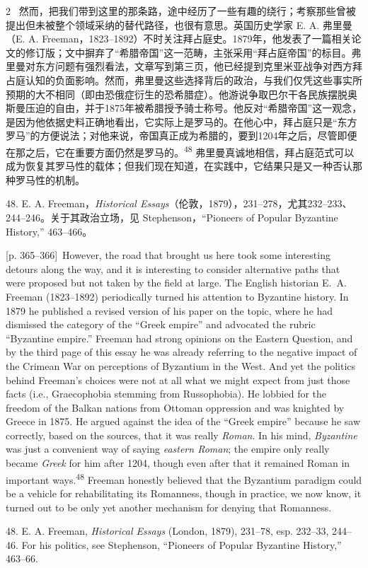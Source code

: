 \documentclass[10pt,a4paper]{article}
\begin{document}
\begin{paracol}{2}
\switchcolumn*
{\scriptsize\color{gray}[p. 365–366]}\ 然而，把我们带到这里的那条路，途中经历了一些有趣的绕行；考察那些曾被提出但未被整个领域采纳的替代路径，也很有意思。英国历史学家 E. A. 弗里曼（E. A. Freeman，1823–1892）不时关注拜占庭史。1879年，他发表了一篇相关论文的修订版；文中摒弃了“希腊帝国”这一范畴，主张采用“拜占庭帝国”的标目。弗里曼对东方问题有强烈看法，文章写到第三页，他已经提到克里米亚战争对西方拜占庭认知的负面影响。然而，弗里曼这些选择背后的政治，与我们仅凭这些事实所预期的大不相同（即由恐俄症衍生的恐希腊症）。他游说争取巴尔干各民族摆脱奥斯曼压迫的自由，并于1875年被希腊授予骑士称号。他反对“希腊帝国”这一观念，是因为他依据史料正确地看出，它实际上是罗马的。在他心中，拜占庭只是“东方罗马”的方便说法；对他来说，帝国真正成为希腊的，要到1204年之后，尽管即便在那之后，它在重要方面仍然是罗马的。\nobreak\textsuperscript{48} 弗里曼真诚地相信，拜占庭范式可以成为恢复其罗马性的载体；但我们现在知道，在实践中，它结果只是又一种否认那种罗马性的机制。\par{\small 48. E. A. Freeman，\textit{Historical Essays}（伦敦，1879），231–278，尤其232–233、244–246。关于其政治立场，见 Stephenson，“Pioneers of Popular Byzantine History,” 463–466。\par}
\switchcolumn
{\scriptsize\color{gray}[p. 365–366]}\ However, the road that brought us here took some interesting detours along the way, and it is interesting to consider alternative paths that were proposed but not taken by the field at large. The English historian E. A. Freeman (1823–1892) periodically turned his attention to Byzantine history. In 1879 he published a revised version of his paper on the topic, where he had dismissed the category of the “Greek empire” and advocated the rubric “Byzantine empire.” Freeman had strong opinions on the Eastern Question, and by the third page of this essay he was already referring to the negative impact of the Crimean War on perceptions of Byzantium in the West. And yet the politics behind Freeman’s choices were not at all what we might expect from just those facts (i.e., Graecophobia stemming from Russophobia). He lobbied for the freedom of the Balkan nations from Ottoman oppression and was knighted by Greece in 1875. He argued against the idea of the “Greek empire” because he saw correctly, based on the sources, that it was really \textit{Roman}. In his mind, \textit{Byzantine} was just a convenient way of saying \textit{eastern Roman}; the empire only really became \textit{Greek} for him after 1204, though even after that it remained Roman in important ways.\nobreak\textsuperscript{48} Freeman honestly believed that the Byzantium paradigm could be a vehicle for rehabilitating its Romanness, though in practice, we now know, it turned out to be only yet another mechanism for denying that Romanness.\par{\small 48. E. A. Freeman, \textit{Historical Essays} (London, 1879), 231–78, esp. 232–33, 244–46. For his politics, see Stephenson, “Pioneers of Popular Byzantine History,” 463–66.\par}

\end{paracol}
\end{document}
